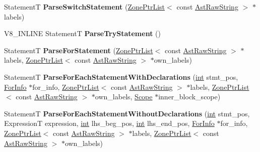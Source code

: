 \begin{DoxyCompactItemize}
\item 
\mbox{\label{classv8_1_1internal_1_1ParserBase_ae0e5209c7fdcc8e7e051a56df41048ee}} 
StatementT {\bfseries Parse\+Switch\+Statement} (\mbox{\hyperlink{classv8_1_1internal_1_1ZoneList}{Zone\+Ptr\+List}}$<$ const \mbox{\hyperlink{classv8_1_1internal_1_1AstRawString}{Ast\+Raw\+String}} $>$ $\ast$labels)
\item 
\mbox{\label{classv8_1_1internal_1_1ParserBase_ae44f11347ab22e970247532ad358afcf}} 
V8\+\_\+\+I\+N\+L\+I\+NE StatementT {\bfseries Parse\+Try\+Statement} ()
\item 
\mbox{\label{classv8_1_1internal_1_1ParserBase_a1f8a54f8828d5bfd78420cd90281ee6d}} 
StatementT {\bfseries Parse\+For\+Statement} (\mbox{\hyperlink{classv8_1_1internal_1_1ZoneList}{Zone\+Ptr\+List}}$<$ const \mbox{\hyperlink{classv8_1_1internal_1_1AstRawString}{Ast\+Raw\+String}} $>$ $\ast$labels, \mbox{\hyperlink{classv8_1_1internal_1_1ZoneList}{Zone\+Ptr\+List}}$<$ const \mbox{\hyperlink{classv8_1_1internal_1_1AstRawString}{Ast\+Raw\+String}} $>$ $\ast$own\+\_\+labels)
\item 
\mbox{\label{classv8_1_1internal_1_1ParserBase_a5e2ea33d92f538a9cd76d9e198b8549e}} 
StatementT {\bfseries Parse\+For\+Each\+Statement\+With\+Declarations} (\mbox{\hyperlink{classint}{int}} stmt\+\_\+pos, \mbox{\hyperlink{structv8_1_1internal_1_1ParserBase_1_1ForInfo}{For\+Info}} $\ast$for\+\_\+info, \mbox{\hyperlink{classv8_1_1internal_1_1ZoneList}{Zone\+Ptr\+List}}$<$ const \mbox{\hyperlink{classv8_1_1internal_1_1AstRawString}{Ast\+Raw\+String}} $>$ $\ast$labels, \mbox{\hyperlink{classv8_1_1internal_1_1ZoneList}{Zone\+Ptr\+List}}$<$ const \mbox{\hyperlink{classv8_1_1internal_1_1AstRawString}{Ast\+Raw\+String}} $>$ $\ast$own\+\_\+labels, \mbox{\hyperlink{classv8_1_1internal_1_1Scope}{Scope}} $\ast$inner\+\_\+block\+\_\+scope)
\item 
\mbox{\label{classv8_1_1internal_1_1ParserBase_aba71b0e98ebe72cadd62a8ffeba8a77b}} 
StatementT {\bfseries Parse\+For\+Each\+Statement\+Without\+Declarations} (\mbox{\hyperlink{classint}{int}} stmt\+\_\+pos, ExpressionT expression, \mbox{\hyperlink{classint}{int}} lhs\+\_\+beg\+\_\+pos, \mbox{\hyperlink{classint}{int}} lhs\+\_\+end\+\_\+pos, \mbox{\hyperlink{structv8_1_1internal_1_1ParserBase_1_1ForInfo}{For\+Info}} $\ast$for\+\_\+info, \mbox{\hyperlink{classv8_1_1internal_1_1ZoneList}{Zone\+Ptr\+List}}$<$ const \mbox{\hyperlink{classv8_1_1internal_1_1AstRawString}{Ast\+Raw\+String}} $>$ $\ast$labels, \mbox{\hyperlink{classv8_1_1internal_1_1ZoneList}{Zone\+Ptr\+List}}$<$ const \mbox{\hyperlink{classv8_1_1internal_1_1AstRawString}{Ast\+Raw\+String}} $>$ $\ast$own\+\_\+labels)

\end{DoxyCompactItemize}
